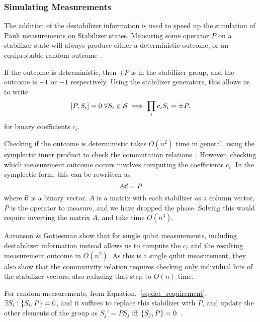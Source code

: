 \subsubsection*{Simulating Measurements}
The addition of the destabilizer information is  used to speed up the simulation of Pauli measurements on Stabilizer states. Measuring some operator $P$ on a stabilizer state will always produce either a deterministic outcome, or an equiprobable random outcome~\cite{Gottesman1998b}.\par
If the outcome is deterministic, then $\pm P$ is in the stabilizer group, and the outcome is $+1$ or $-1$ respectively. Using the stabilizer generators, this allows us to write 
\begin{equation}
    \comm{P}{S_{i}}=0\;\forall S_{i}\in\mathcal{S} \implies \prod_{i}c_{i}S_{i} = \pm P. \label{eq:det_requirement}
\end{equation}
for binary coefficients $c_{i}$.\par
Checking if the outcome is deterministic takes $O(n^{2})$ time in general, using the symplectic inner product to check the commutation relations~\cite{Dehaene2003}. However, checking which measurement outcome occurs involves computing the coefficients $c_{i}$. In the symplectic form, this can be rewritten as
\[
    A\va{c}=P
\]
where $\va{c}$ is a binary vector, $A$ is a matrix with each stabilizer as a column vector, $P$ is the operator to measure, and we have dropped the phase. Solving this would require inverting the matrix $A$, and take time $O(n^{3})$.\par
Aaronson \& Gottesman show that for single qubit measurements, including destabilizer information instead allows us to compute the $c_{i}$ and the resulting measurement outcome in $O(n^{2})$. As this is a single qubit measurement, they also show that the commutivity relation requires checking only individual bits of the stabilizer vectors, also reducing that step to $O(n)$ time.\par
For random measurements, from Equation.~\ref{eq:det_requirement}, $\exists S_{i}:\acomm{S_{i}}{P}=0$, and it suffices to replace this stabilizer with $P$, and update the other elements of the group as $S_{j}'=PS_{j}$ iff $\acomm{S_{j}}{P}=0$~\cite{Gottesman1998b,Aaronson2004}.
